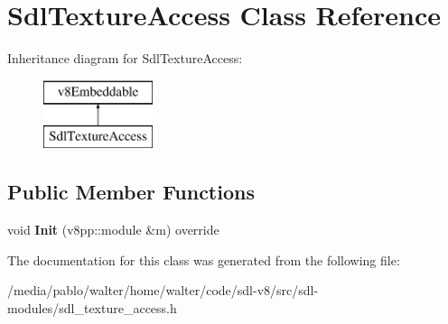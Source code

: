 \hypertarget{classSdlTextureAccess}{}\section{Sdl\+Texture\+Access Class Reference}
\label{classSdlTextureAccess}
Inheritance diagram for Sdl\+Texture\+Access\+:\begin{figure}[H]
\begin{center}
\leavevmode
\includegraphics[height=2.000000cm]{classSdlTextureAccess}
\end{center}
\end{figure}
\subsection*{Public Member Functions}
\begin{DoxyCompactItemize}
\item 
\mbox{\label{classSdlTextureAccess_a5512a60f6d98bc780487354073091f1e}} 
void {\bfseries Init} (v8pp\+::module \&m) override
\end{DoxyCompactItemize}


The documentation for this class was generated from the following file\+:\begin{DoxyCompactItemize}
\item 
/media/pablo/walter/home/walter/code/sdl-\/v8/src/sdl-\/modules/sdl\+\_\+texture\+\_\+access.\+h\end{DoxyCompactItemize}
